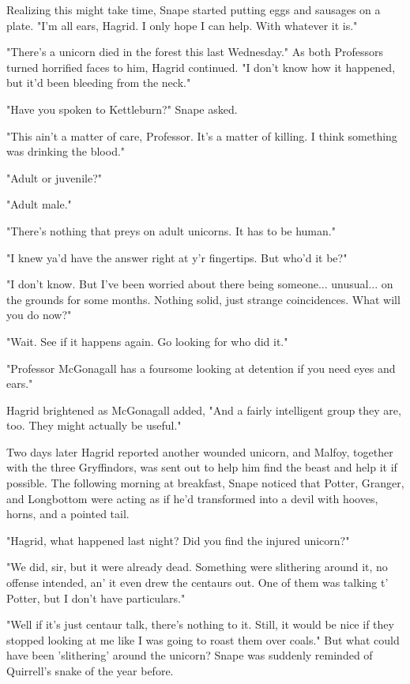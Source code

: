 \documentclass[a4paper,11pt]{article}
\begin{document}
Realizing this might take time, Snape started putting eggs and sausages on a plate. "I'm all ears, Hagrid. I only hope I can help. With whatever it is."

"There's a unicorn died in the forest this last Wednesday." As both Professors turned horrified faces to him, Hagrid continued. "I don't know how it happened, but it'd been bleeding from the neck."

"Have you spoken to Kettleburn?" Snape asked.

"This ain't a matter of care, Professor. It's a matter of killing. I think something was drinking the blood."

"Adult or juvenile?"

"Adult male."

"There's nothing that preys on adult unicorns. It has to be human."

"I knew ya'd have the answer right at y'r fingertips. But who'd it be?"

"I don't know. But I've been worried about there being someone... unusual... on the grounds for some months. Nothing solid, just strange coincidences. What will you do now?"

"Wait. See if it happens again. Go looking for who did it."

"Professor McGonagall has a foursome looking at detention if you need eyes and ears."

Hagrid brightened as McGonagall added, "And a fairly intelligent group they are, too. They might actually be useful."

Two days later Hagrid reported another wounded unicorn, and Malfoy, together with the three Gryffindors, was sent out to help him find the beast and help it if possible. The following morning at breakfast, Snape noticed that Potter, Granger, and Longbottom were acting as if he'd transformed into a devil with hooves, horns, and a pointed tail.

"Hagrid, what happened last night? Did you find the injured unicorn?"

"We did, sir, but it were already dead. Something were slithering around it, no offense intended, an' it even drew the centaurs out. One of them was talking t' Potter, but I don't have particulars."

"Well if it's just centaur talk, there's nothing to it. Still, it would be nice if they stopped looking at me like I was going to roast them over coals." But what could have been 'slithering' around the unicorn? Snape was suddenly reminded of Quirrell's snake of the year before.
\end{document}
